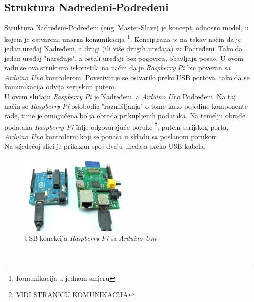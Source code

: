 \subsection{Struktura Nadređeni-Podređeni}

Struktura Nadređeni-Podređeni (eng. Master-Slave) je koncept, odnosno model, u kojem je ostvarena unarna komunikacija \footnote{Komunikacija u jednom smjeru}. Koncipirana je na takav način da je jedan uređaj Nadređeni, a drugi (ili više drugih uređaja) su Podređeni. Tako da jedan uređaj "naređuje", a ostali uređaji bez pogovora, obavljaju posao. U ovom radu se ova struktura iskoristila na način da je \textit{Raspberry Pi} bio povezan sa \textit{Arduino Uno} kontrolerom. Povezivanje se ostvarilo preko USB portova, tako da se komunikacija odvija serijskim putem.\\
U ovom slučaju \textit{Raspberry Pi} je Nadređeni, a \textit{Arduino Uno} Podređeni. Na taj način se \textit{Raspberry Pi} oslobodio "razmišljanja" o tome kako pojedine komponente rade, time je omogućena bolja obrada prikupljenih podataka. Na temelju obrade podataka \textit{Raspberry Pi} šalje odgovarajuće poruke \footnote{VIDI STRANICU KOMUNIKACIJA}, putem serijskog porta, \textit{Arduino Uno} kontroleru; koji se ponaša u skladu sa poslanom porukom.\\
Na sljedećoj slici je prikazan spoj dvaju uređaja preko USB kabela.
\begin{figure}[h]
    \centering
    \includegraphics[width=0.5\textwidth]{master_slave.jpg}
    \caption{USB konekcija \textit{Raspberry Pi} sa \textit{Arduino Uno}}
    \label{fig:mesh1}
\end{figure}
\\
